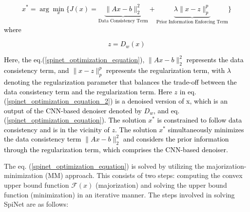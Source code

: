\documentclass[sn-vancouver,Numbered]{sn-jnl}%
\begin{document}

\textcolor{black}{
\begin{equation}
\label{spinet_optimization_equation}
x^* = \arg \min_{x} \{ J(x) = \underbrace{\|Ax - b\|^2_2}_{\text{Data Consistency Term}} + \underbrace{\lambda \|x - z\|^p_p}_{\text{Prior Information Enforcing Term}} \}
\end{equation}}
\textcolor{black}{where}


\textcolor{black}{
\begin{equation}
\label{spinet_optimization_equation_2}
z=D_{w}(x)
\end{equation}}

\noindent
\textcolor{black}{Here, the eq.(\ref{spinet_optimization_equation}), $\|Ax - b\|^2_2$ represents the data consistency term, and $\|x - z\|^p_p$ represents the regularization term, with $\lambda$ denoting the regularization parameter that balances the trade-off between the data consistency term and the regularization term. Here $z$ in eq.(\ref{spinet_optimization_equation_2}) is a denoised version of x, which is an output of the CNN-based denoiser denoted by $D_w$, and eq. ~ (\ref{spinet_optimization_equation}). The solution $x^{*}$ is constrained to follow data consistency and is in the vicinity of $z$. The solution $x^{*}$ simultaneously minimizes the data consistency term $\|Ax - b\|^2_2$ and considers the prior information through the regularization term, which comprises the CNN-based denoiser.}


\noindent
The eq. (\ref{spinet_optimization_equation}) is solved by utilizing the majorization-minimization (MM) approach. This consists of two steps: computing the convex upper bound function $\mathcal{F}(x)$ (majorization) and solving the upper bound function (minimization) in an iterative manner. The steps involved in solving SpiNet are as follows:
\end{document}
